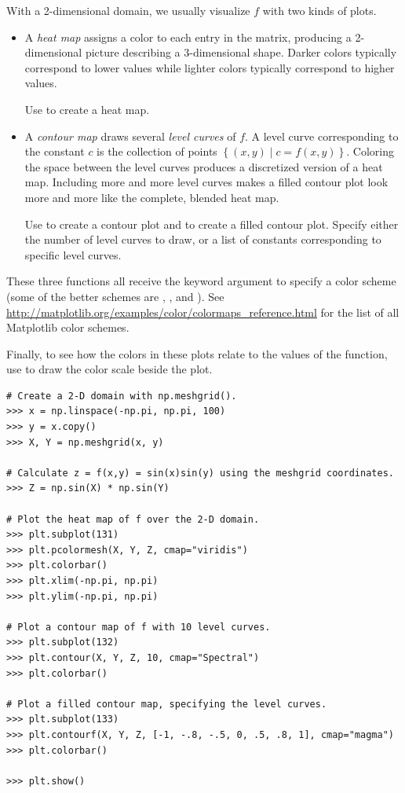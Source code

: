 With a 2-dimensional domain, we usually visualize $f$ with two kinds of plots.

\begin{itemize}
\item A \emph{heat map} assigns a color to each entry in the matrix, producing a 2-dimensional picture describing a 3-dimensional shape.
Darker colors typically correspond to lower values while lighter colors typically correspond to higher values.

Use  to create a heat map.

\item A \emph{contour map} draws several \emph{level curves} of $f$.
A level curve corresponding to the constant $c$ is the collection of points $\left\{(x,y)\mid c = f(x,y)\right\}$.
Coloring the space between the level curves produces a discretized version of a heat map.
Including more and more level curves makes a filled contour plot look more and more like the complete, blended heat map.

Use  to create a contour plot and  to create a filled contour plot.
Specify either the number of level curves to draw, or a list of constants corresponding to specific level curves.
\end{itemize}

These three functions all receive the keyword argument  to specify a color scheme (some of the better schemes are , , and ).
See \url{http://matplotlib.org/examples/color/colormaps_reference.html} for the list of all Matplotlib color schemes.

Finally, to see how the colors in these plots relate to the values of the function, use  to draw the color scale beside the plot.

\begin{lstlisting}
# Create a 2-D domain with np.meshgrid().
>>> x = np.linspace(-np.pi, np.pi, 100)
>>> y = x.copy()
>>> X, Y = np.meshgrid(x, y)

# Calculate z = f(x,y) = sin(x)sin(y) using the meshgrid coordinates.
>>> Z = np.sin(X) * np.sin(Y)

# Plot the heat map of f over the 2-D domain.
>>> plt.subplot(131)
>>> plt.pcolormesh(X, Y, Z, cmap="viridis")
>>> plt.colorbar()
>>> plt.xlim(-np.pi, np.pi)
>>> plt.ylim(-np.pi, np.pi)

# Plot a contour map of f with 10 level curves.
>>> plt.subplot(132)
>>> plt.contour(X, Y, Z, 10, cmap="Spectral")
>>> plt.colorbar()

# Plot a filled contour map, specifying the level curves.
>>> plt.subplot(133)
>>> plt.contourf(X, Y, Z, [-1, -.8, -.5, 0, .5, .8, 1], cmap="magma")
>>> plt.colorbar()

>>> plt.show()
\end{lstlisting}

